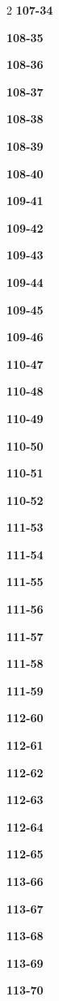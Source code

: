 \documentclass[10pt,a4paper]{article}
\begin{document}
\begin{multicols}{2}
\noindent\textbf{107-34}\ \par
\noindent\textbf{108-35}\ \par
\noindent\textbf{108-36}\ \par
\noindent\textbf{108-37}\ \par
\noindent\textbf{108-38}\ \par
\noindent\textbf{108-39}\ \par
\noindent\textbf{108-40}\ \par
\noindent\textbf{109-41}\ \par
\noindent\textbf{109-42}\ \par
\noindent\textbf{109-43}\ \par
\noindent\textbf{109-44}\ \par
\noindent\textbf{109-45}\ \par
\noindent\textbf{109-46}\ \par
\noindent\textbf{110-47}\ \par
\noindent\textbf{110-48}\ \par
\noindent\textbf{110-49}\ \par
\noindent\textbf{110-50}\ \par
\noindent\textbf{110-51}\ \par
\noindent\textbf{110-52}\ \par
\noindent\textbf{111-53}\ \par
\noindent\textbf{111-54}\ \par
\noindent\textbf{111-55}\ \par
\noindent\textbf{111-56}\ \par
\noindent\textbf{111-57}\ \par
\noindent\textbf{111-58}\ \par
\noindent\textbf{111-59}\ \par
\noindent\textbf{112-60}\ \par
\noindent\textbf{112-61}\ \par
\noindent\textbf{112-62}\ \par
\noindent\textbf{112-63}\ \par
\noindent\textbf{112-64}\ \par
\noindent\textbf{112-65}\ \par
\noindent\textbf{113-66}\ \par
\noindent\textbf{113-67}\ \par
\noindent\textbf{113-68}\ \par
\noindent\textbf{113-69}\ \par
\noindent\textbf{113-70}\ \par

\end{multicols}
\end{document}

